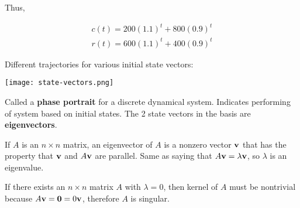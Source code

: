 Thus,

\[\begin{array}{l}
    c(t)=200(1.1)^{t}+800(0.9)^{t} \\
    r(t)=600(1.1)^{t}+400(0.9)^{t}
    \end{array}\]

Different trajectories for various initial state vectors:

\begin{center}
    \texttt{[image: state-vectors.png]}
\end{center}

Called a \textbf{phase portrait} for a discrete dynamical system.
Indicates performing of system based on initial states.
The 2 state vectors in the basis are \textbf{eigenvectors}.

\begin{framed}
    If $A$ is an $n\times n$ matrix, an eigenvector of $A$ is a nonzero vector $\textbf{v}$
    that has the property that $\textbf{v}$ and $A\textbf{v}$ are parallel.
    Same as saying that $A\textbf{v}=\lambda\textbf{v}$, so $\lambda$ is an eigenvalue.
\end{framed}

If there exists an $n\times n$ matrix $A$ with $\lambda=0$, then kernel of $A$ must be nontrivial
because $A\textbf{v}=\textbf{0}=0\textbf{v}$, therefore $A$ is singular.